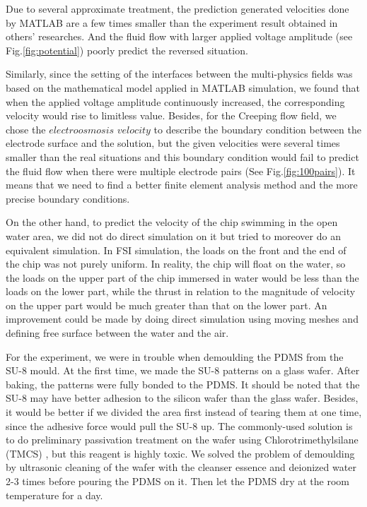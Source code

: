 \documentclass[journal,svgnames,twocolumn,x11names]{IEEEtran}
\begin{document}
Due to several approximate treatment, the prediction generated velocities done by MATLAB are a few times smaller than the experiment result obtained in others' researches. And the fluid flow with larger applied voltage amplitude (see Fig.\ref{fig:potential}) poorly predict the reversed situation. 

Similarly, since the setting of the interfaces between the multi-physics fields was based on the mathematical model applied in MATLAB simulation, we found that when the applied voltage amplitude continuously increased, the corresponding velocity would rise to limitless value. Besides, for the Creeping flow field, we chose the $electroosmosis$ $velocity$ to describe the boundary condition between the electrode surface and the solution, but the given velocities were several times smaller than the real situations and this boundary condition would fail to predict the fluid flow when there were multiple electrode pairs (See Fig.\ref{fig:100pairs}). It means that we need to find a better finite element analysis method and the more precise boundary conditions.

On the other hand, to predict the velocity of the chip swimming in the open water area, we did not do direct simulation on it but tried to moreover do an equivalent simulation. In FSI simulation, the loads on the front and the end of the chip was not purely uniform. In reality, the chip will float on the water, so the loads on the upper part of the chip immersed in water would be less than the loads on the lower part, while the thrust in relation to the magnitude of velocity on the upper part would be much greater than that on the lower part. An improvement could be made by doing direct simulation using moving meshes and defining free surface between the water and the air.

For the experiment, we were in trouble when demoulding the PDMS from the SU-8 mould. At the first time, we made the SU-8 patterns on a glass wafer. After baking, the patterns were fully bonded to the PDMS. It should be noted that the SU-8 may have better adhesion to the silicon wafer than the glass wafer. Besides, it would be better if we divided the area first instead of tearing them at one time, since the adhesive force would pull the SU-8 up. The commonly-used solution is to do preliminary passivation treatment on the wafer using Chlorotrimethylsilane (TMCS) \cite{sun2016low}, but this reagent is highly toxic. We solved the problem of demoulding by ultrasonic cleaning of the wafer with the cleanser essence and deionized water 2-3 times before pouring the PDMS on it. Then let the PDMS dry at the room temperature for a day.
\end{document}
